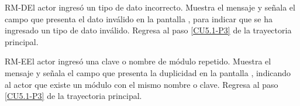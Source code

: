 	\begin{UCtrayectoriaA}{RM-D}{El actor ingresó un tipo de dato incorrecto.}
		\UCpaso[\UCsist] Muestra el mensaje  y señala el campo que presenta el dato inválido en la pantalla , para indicar que se ha ingresado un tipo de dato inválido.
		\UCpaso Regresa al paso \ref{CU5.1-P3} de la trayectoria principal.
	\end{UCtrayectoriaA}
	
	\begin{UCtrayectoriaA}{RM-E}{El actor ingresó una clave o nombre de módulo repetido.}
		\UCpaso[\UCsist] Muestra el mensaje  y señala el campo que presenta la duplicidad en la pantalla , indicando al actor que existe un módulo con el mismo nombre o clave.
		\UCpaso Regresa al paso \ref{CU5.1-P3} de la trayectoria principal.
	\end{UCtrayectoriaA}

	

